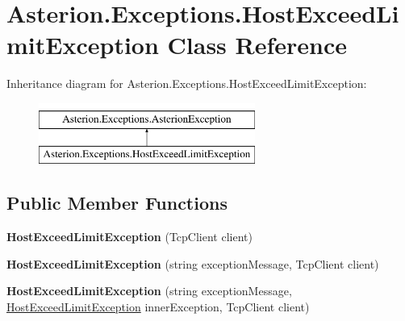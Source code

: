 \hypertarget{classAsterion_1_1Exceptions_1_1HostExceedLimitException}{\section{Asterion.\-Exceptions.\-Host\-Exceed\-Limit\-Exception Class Reference}
\label{classAsterion_1_1Exceptions_1_1HostExceedLimitException}
}
Inheritance diagram for Asterion.\-Exceptions.\-Host\-Exceed\-Limit\-Exception\-:\begin{figure}[H]
\begin{center}
\leavevmode
\includegraphics[height=2.000000cm]{classAsterion_1_1Exceptions_1_1HostExceedLimitException}
\end{center}
\end{figure}
\subsection*{Public Member Functions}
\begin{DoxyCompactItemize}
\item 
\hypertarget{classAsterion_1_1Exceptions_1_1HostExceedLimitException_a599b7669838d5ffbe20071f257b83a09}{{\bfseries Host\-Exceed\-Limit\-Exception} (Tcp\-Client client)}\label{classAsterion_1_1Exceptions_1_1HostExceedLimitException_a599b7669838d5ffbe20071f257b83a09}

\item 
\hypertarget{classAsterion_1_1Exceptions_1_1HostExceedLimitException_a58fd644677ece89502e5f545a257dab1}{{\bfseries Host\-Exceed\-Limit\-Exception} (string exception\-Message, Tcp\-Client client)}\label{classAsterion_1_1Exceptions_1_1HostExceedLimitException_a58fd644677ece89502e5f545a257dab1}

\item 
\hypertarget{classAsterion_1_1Exceptions_1_1HostExceedLimitException_a99d89656487be423d4f1c0c2b05b0c65}{{\bfseries Host\-Exceed\-Limit\-Exception} (string exception\-Message, \hyperlink{classAsterion_1_1Exceptions_1_1HostExceedLimitException}{Host\-Exceed\-Limit\-Exception} inner\-Exception, Tcp\-Client client)}\label{classAsterion_1_1Exceptions_1_1HostExceedLimitException_a99d89656487be423d4f1c0c2b05b0c65}

\end{DoxyCompactItemize}
